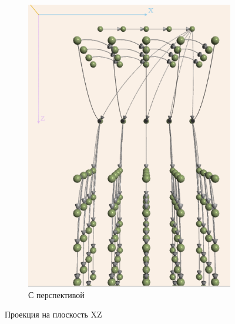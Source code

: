 \documentclass[12pt, fleqn]{article}
\theoremstyle{definition}
\begin{document}
\begin{figure}[ht]
\begin{subfigure}{0.49\textwidth}
\begin{center}
 \includegraphics[scale=0.67]{XZ_persp.png}
 \caption{С перспективой}
\end{center}
\end{subfigure}
\caption{Проекция на плоскость XZ}
\label{fig:XZ}
\end{figure}
\end{document}
